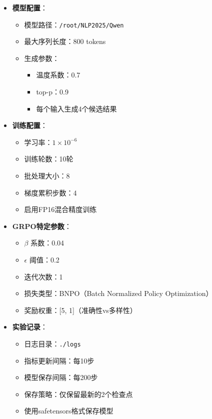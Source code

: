 \documentclass[a4paper, 12pt]{article}
\begin{document}
\begin{itemize}
    \item \textbf{模型配置}：
        \begin{itemize}
            \item 模型路径：\texttt{/root/NLP2025/Qwen}
            \item 最大序列长度：800 tokens
            \item 生成参数：
                \begin{itemize}
                    \item 温度系数：0.7
                    \item top-p：0.9
                    \item 每个输入生成4个候选结果
                \end{itemize}
        \end{itemize}
    
    \item \textbf{训练配置}：
        \begin{itemize}
            \item 学习率：$1 \times 10^{-6}$
            \item 训练轮数：10轮
            \item 批处理大小：8
            \item 梯度累积步数：4
            \item 启用FP16混合精度训练
        \end{itemize}
    
    \item \textbf{GRPO特定参数}：
        \begin{itemize}
            \item $\beta$ 系数：0.04
            \item $\epsilon$ 阈值：0.2
            \item 迭代次数：1
            \item 损失类型：BNPO（Batch Normalized Policy Optimization）
            \item 奖励权重：[5, 1]（准确性vs多样性）
        \end{itemize}
    
    \item \textbf{实验记录}：
        \begin{itemize}
            \item 日志目录：\texttt{./logs}
            \item 指标更新间隔：每10步
            \item 模型保存间隔：每200步
            \item 保存策略：仅保留最新的2个检查点
            \item 使用safetensors格式保存模型
        \end{itemize}
\end{itemize}
\end{document}
